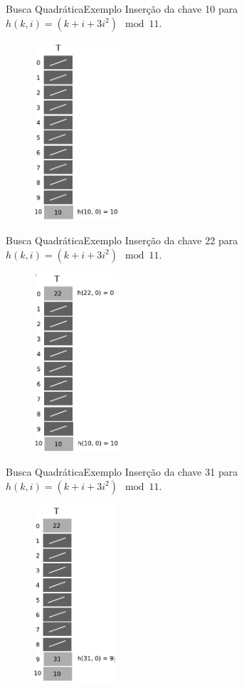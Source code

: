 \documentclass[aspectratio=169]{beamer}
\begin{document}
\begin{frame}{Busca Quadrática}{Exemplo}
Inserção da chave 10 para $h(k, i) = (k + i + 3i^2 ) \mod 11$.
\begin{figure}[!h]
  \centering
  \includegraphics[width=90pt]{imagens/ex_end_aberto_quadratico2.png}
  \label{fig_ex_end_aberto_quadratico2}
\end{figure}
\end{frame}

\begin{frame}{Busca Quadrática}{Exemplo}
Inserção da chave 22 para $h(k, i) = (k + i + 3i^2 ) \mod 11$.
\begin{figure}[!h]
  \centering
  \includegraphics[width=90pt]{imagens/ex_end_aberto_quadratico3.png}
  \label{fig_ex_end_aberto_quadratico3}
\end{figure}
\end{frame}

\begin{frame}{Busca Quadrática}{Exemplo}
Inserção da chave 31 para $h(k, i) = (k + i + 3i^2 ) \mod 11$.
\begin{figure}[!h]
  \centering
  \includegraphics[width=86pt]{imagens/ex_end_aberto_quadratico4.png}
  \label{fig_ex_end_aberto_quadratico4}
\end{figure}
\end{frame}
\end{document}
